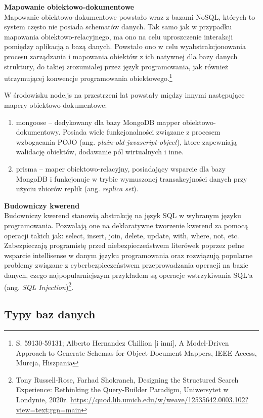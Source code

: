 \documentclass[12pt, a4paper, twoside, openany]{book}
\newcommand{\forceindent}{\leavevmode{\parindent=1.3em\indent}}
\begin{document}
\newpage
\textbf{Mapowanie obiektowo-dokumentowe\\}
\forceindent Mapowanie obiektowo-dokumentowe powstało wraz z bazami NoSQL, których to system często nie posiada schematów danych.
Tak samo jak w przypadku mapowania obiektowo-relacyjnego, ma ono na celu uproszczenie interakcji pomiędzy aplikacją a bazą danych. Powstało ono w celu wyabstrakcjonowania procesu zarządzania i mapowania obiektów z ich natywnej dla bazy danych struktury, do takiej zrozumiałej przez język programowania, jak również utrzymującej konwencje programowania obiektowego.\footnote{S. 59130-59131; Alberto Hernandez Chillion [i inni], A Model-Driven Approach to Generate Schemas for Object-Document Mappers, IEEE Access, Murcja, Hiszpania}

W środowisku node.js na przestrzeni lat powstały między innymi następujące mapery obiektowo-dokumentowe:
\begin{enumerate}[label=--]
    \item mongoose -- dedykowany dla bazy MongoDB mapper obiektowo-dokumentowy. Posiada wiele funkcjonalności związane z procesem wzbogacania POJO (ang. \textit{plain-old-javascript-object}), ktore zapewniają walidację obiektów, dodawanie pól wirtualnych i inne.
    \item prisma -- maper obiektowo-relacyjny, posiadający wsparcie dla bazy MongoDB i funkcjonuje w trybie wymuszonej transakcyjności danych przy użyciu zbiorów replik (ang. \textit{replica set}).
\end{enumerate}

\textbf{Budowniczy kwerend\\}
\forceindent  Budowniczy kwerend stanowią abstrakcję na język SQL w wybranym języku programowania.
Pozwalają one na deklaratywne tworzenie kwerend za pomocą operacji takich jak: select, insert, join, delete, update, with, where, not, etc.
Zabezpieczają programistę przed niebezpieczeństwem literówek poprzez pełne wsparcie intellisense w danym języku programowania oraz rozwiązują popularne problemy związane z cyberbezpieczeństwem przeprowadzania operacji na bazie danych, czego najpopularniejszym przykładem są operacje wstrzykiwania SQL`a (ang. \textit{SQL Injection})\footnote{Tony Russell-Rose, Farhad Shokraneh, Designing the Structured Search Experience: Rethinking the Query-Builder Paradigm, Uniwersytet w Londynie, 2020r. \url{https://quod.lib.umich.edu/w/weave/12535642.0003.102?view=text;rgn=main}}.

\subsection{Typy baz danych}
\end{document}
